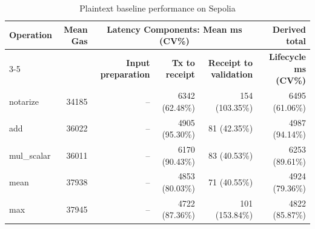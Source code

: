 \begin{table}[!t]
\caption{Plaintext baseline performance on Sepolia}
\label{tab:baseline-sepolia-benchmark}
\centering
\scriptsize
\setlength{\tabcolsep}{4pt}
\begin{tabular}{|l|r|rrr|r|}
\hline
\textbf{Operation} &
\textbf{Mean Gas} &
\multicolumn{3}{c|}{\textbf{Latency Components: Mean ms (CV\%)}} &
\textbf{Derived total} \\
\cline{3-5}
&
&
\textbf{Input preparation} &
\textbf{Tx to receipt} &
\textbf{Receipt to validation} &
\textbf{Lifecycle ms (CV\%)} \\
\hline

notarize & 34185 & -- & 6342 (62.48\%) & 154 (103.35\%) & 6495 (61.06\%) \\
add & 36022 & -- & 4905 (95.30\%) & 81 (42.35\%) & 4987 (94.14\%) \\
mul\_scalar & 36011 & -- & 6170 (90.43\%) & 83 (40.53\%) & 6253 (89.61\%) \\
mean & 37938 & -- & 4853 (80.03\%) & 71 (40.55\%) & 4924 (79.36\%) \\
max & 37945 & -- & 4722 (87.36\%) & 101 (153.84\%) & 4822 (85.87\%) \\
\hline
\end{tabular}
\end{table}

